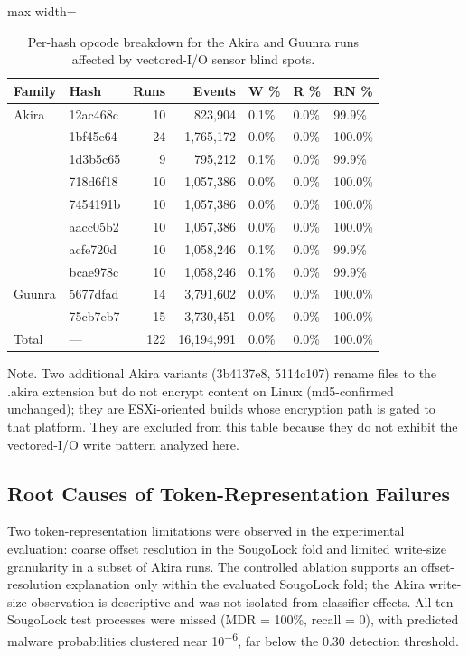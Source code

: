 \begin{table}[htbp]
\centering
\caption{Per-hash opcode breakdown for the Akira and Guunra runs affected by vectored-I/\allowbreak{}O sensor blind spots.}\label{tab:4-7}
\begin{adjustbox}{max width=\textwidth}
\small
\begin{tabular}{llrrlll}
\hline
\textbf{Family} & \textbf{Hash} & \textbf{Runs} & \textbf{Events} & \textbf{W \%} & \textbf{R \%} & \textbf{RN \%} \\
\hline
Akira & 12ac468c & 10 & 823,904 & 0.1\% & 0.0\% & 99.9\% \\
 & 1bf45e64 & 24 & 1,765,172 & 0.0\% & 0.0\% & 100.0\% \\
 & 1d3b5c65 & 9 & 795,212 & 0.1\% & 0.0\% & 99.9\% \\
 & 718d6f18 & 10 & 1,057,386 & 0.0\% & 0.0\% & 100.0\% \\
 & 7454191b & 10 & 1,057,386 & 0.0\% & 0.0\% & 100.0\% \\
 & aacc05b2 & 10 & 1,057,386 & 0.0\% & 0.0\% & 100.0\% \\
 & acfe720d & 10 & 1,058,246 & 0.1\% & 0.0\% & 99.9\% \\
 & bcae978c & 10 & 1,058,246 & 0.1\% & 0.0\% & 99.9\% \\
Guunra & 5677dfad & 14 & 3,791,602 & 0.0\% & 0.0\% & 100.0\% \\
 & 75cb7eb7 & 15 & 3,730,451 & 0.0\% & 0.0\% & 100.0\% \\
Total & --- & 122 & 16,194,991 & 0.0\% & 0.0\% & 100.0\% \\
\hline
\end{tabular}
\end{adjustbox}
\end{table}

Note. Two additional Akira variants (3b4137e8, 5114c107) rename files to the .akira extension but do not encrypt content on Linux (md5-confirmed unchanged); they are ESXi-oriented builds whose encryption path is gated to that platform. They are excluded from this table because they do not exhibit the vectored-I/\allowbreak{}O write pattern analyzed here.

\subsection{Root Causes of Token-Representation Failures}\label{sec:4.5.3}

Two token-representation limitations were observed in the experimental evaluation: coarse offset resolution in the SougoLock fold and limited write-size granularity in a subset of Akira runs. The controlled ablation supports an offset-resolution explanation only within the evaluated SougoLock fold; the Akira write-size observation is descriptive and was not isolated from classifier effects. All ten SougoLock test processes were missed (MDR = 100\%, recall = 0), with predicted malware probabilities clustered near 10\textsuperscript{$-$}\textsuperscript{6}, far below the 0.30 detection threshold.


